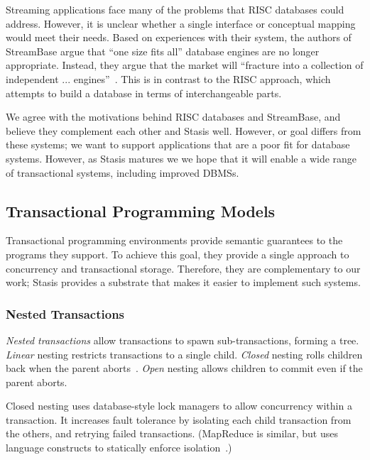 \documentclass[letterpaper,twocolumn,10pt]{article}
\newcommand{\yad}{Stasis\xspace}
\begin{document}
Streaming applications face many of the problems that RISC databases
could address.  However, it is unclear whether a single interface or
conceptual mapping would meet their needs.  Based on experiences with
their system, the authors of StreamBase argue that ``one size fits
all'' database engines are no longer appropriate.  Instead, they argue that
the market will ``fracture into a collection of independent ... engines''~\cite{oneSizeFitsAll}.  This is in contrast to the RISC
approach, which attempts to build a database in terms of
interchangeable parts.

We agree with the motivations behind RISC databases and StreamBase,
and believe they complement each other and \yad well.  However, or
goal differs from these systems; we want to support applications that
are a poor fit for database systems.  However, as \yad matures we we
hope that it will enable a wide range of transactional systems,
including improved DBMSs.

\subsection{Transactional Programming Models}

\label{sec:transactionalProgramming}

Transactional programming environments provide semantic guarantees to
the programs they support.  To achieve this goal, they provide a
single approach to concurrency and transactional storage.
Therefore, they are complementary to our work; \yad provides a
substrate that makes it easier to implement such systems.

\subsubsection{Nested Transactions}

{\em Nested transactions} allow transactions to spawn sub-transactions,
forming a tree.  {\em Linear} nesting
restricts transactions to a single child.  {\em Closed} nesting rolls
children back when the parent aborts~\cite{nestedTransactionBook}.
{\em Open} nesting allows children to commit even if the parent
aborts.

Closed nesting uses database-style lock managers to allow concurrency
within a transaction.  It increases fault tolerance by isolating each
child transaction from the others, and retrying failed
transactions.  (MapReduce is similar, but uses language constructs to
statically enforce isolation~\cite{mapReduce}.)
\end{document}
